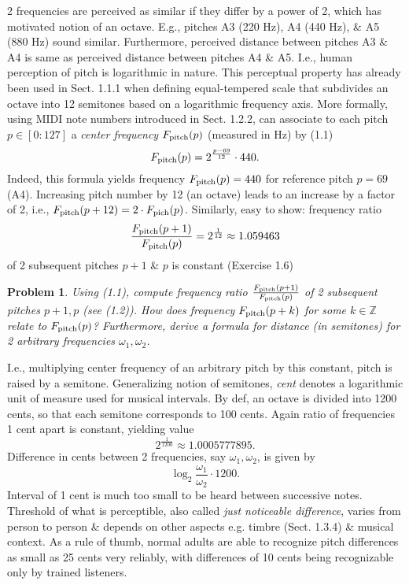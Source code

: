 \documentclass{article}
\newtheorem{problem}{Problem}
\begin{document}
\begin{itemize}
\begin{itemize}
\begin{itemize}
			2 frequencies are perceived as similar if they differ by a power of 2, which has motivated notion of an octave. E.g., pitches A3 (220 Hz), A4 (440 Hz), \& A5 (880 Hz) sound similar. Furthermore, perceived distance between pitches A3 \& A4 is same as perceived distance between pitches A4 \& A5. I.e., human perception of pitch is logarithmic in nature. This perceptual property has already been used in Sect. 1.1.1 when defining equal-tempered scale that subdivides an octave into 12 semitones based on a logarithmic frequency axis. More formally, using MIDI note numbers introduced in Sect. 1.2.2, can associate to each pitch $p\in[0:127]$ a {\it center frequency} $F_{\rm pitch}(p)$ (measured in Hz) by (1.1)
			\begin{equation*}
				F_{\rm pitch}(p) = 2^{\frac{p - 69}{12}}\cdot440.
			\end{equation*}
			Indeed, this formula yields frequency $F_{\rm pitch}(p) = 440$ for reference pitch $p = 69$ (A4). Increasing pitch number by 12 (an octave) leads to an increase by a factor of 2, i.e., $F_{\rm pitch}(p + 12) = 2\cdot F_{\rm pich}(p)$. Similarly, easy to show: frequency ratio
			\begin{equation*}
				\frac{F_{\rm pitch}(p + 1)}{F_{\rm pitch}(p)} = 2^{\frac{1}{12}}\approx1.059463
			\end{equation*}
			of 2 subsequent pitches $p + 1$ \& $p$ is constant (Exercise 1.6)
			\begin{problem}
				Using (1.1), compute frequency ratio $\frac{F_{\rm pitch}(p + 1)}{F_{\rm pitch}(p)}$ of 2 subsequent pitches $p + 1,p$ (see (1.2)). How does frequency $F_{\rm pitch}(p + k)$ for some $k\in\mathbb{Z}$ relate to $F_{\rm pitch}(p)$? Furthermore, derive a formula for distance (in semitones) for 2 arbitrary frequencies $\omega_1,\omega_2$.
			\end{problem}
			I.e., multiplying center frequency of an arbitrary pitch by this constant, pitch is raised by a semitone. Generalizing notion of semitones, {\it cent} denotes a logarithmic unit of measure used for musical intervals. By def, an octave is divided into 1200 cents, so that each semitone corresponds to 100 cents. Again ratio of frequencies 1 cent apart is constant, yielding value
			\begin{equation*}
				2^{\frac{1}{1200}}\approx1.0005777895.
			\end{equation*}
			Difference in cents between 2 frequencies, say $\omega_1,\omega_2$, is given by
			\begin{equation*}
				\log_2\frac{\omega_1}{\omega_2}\cdot1200.
			\end{equation*}
			Interval of 1 cent is much too small to be heard between successive notes. Threshold of what is perceptible, also called {\it just noticeable difference}, varies from person to person \& depends on other aspects e.g. timbre (Sect. 1.3.4) \& musical context. As a rule of thumb, normal adults are able to recognize pitch differences as small as 25 cents very reliably, with differences of 10 cents being recognizable only by trained listeners.
			

\end{itemize}
\end{itemize}
\end{itemize}
\end{document}
